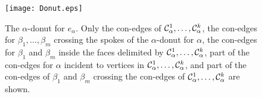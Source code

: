 \documentclass[letter,runningheads]{llncs}
\begin{document}
\begin{figure}[tb]
\begin{center}
\mbox{\texttt{[image: Donut.eps]}}
\caption{The $\alpha$-donut for $e_{\alpha}$. Only the con-edges of ${\cal C}^1_\alpha,\dots,{\cal C}^{k}_\alpha$, the con-edges for $\beta_1,\dots,\beta_m$ crossing the spokes of the $\alpha$-donut for $\alpha$, the con-edges for $\beta_1$ and $\beta_m$ inside the faces delimited by ${\cal C}^1_\alpha,\dots,{\cal C}^{k}_\alpha$, part of the con-edges for $\alpha$ incident to vertices in ${\cal C}^1_\alpha,\dots,{\cal C}^{k}_\alpha$, and part of the con-edges of $\beta_1$ and $\beta_m$ crossing the con-edges of ${\cal C}^1_\alpha,\dots,{\cal C}^{k}_\alpha$ are shown.}
\label{fig:donut}
\end{center}
\end{figure}
\end{document}
